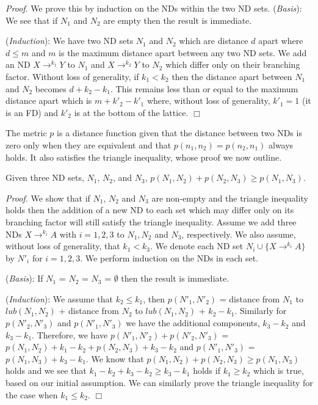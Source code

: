 {\em Proof}. We prove this by induction on the NDs within the two ND sets.\newline 
\smallskip
\indent ({\em Basis}): We see that if $N_1$ and $N_2$ are empty then the
result is immediate.

\smallskip

({\em Induction}): We have two ND sets $N_1$ and $N_2$ which are distance
$d$ apart where $d \le m$ and $m$ is the maximum distance apart between
any two ND sets. We add an ND $X \to^{k_1} Y$
to $N_1$ and $X \to^{k_2} Y$ to $N_2$ which differ only
on their branching factor. Without loss of generality, if $k_1 < k_2$ then the
distance apart between $N_1$ and $N_2$ becomes $d + k_2 - k_1$. This 
remains less than or equal to the maximum distance apart which is $m + k'_2 -
k'_1$ where, without loss of generality, $k'_1 = 1$ (it is an FD) and
$k'_2$ is at the bottom of the lattice. $\Box$

\smallskip

The metric $p$ is a distance function given that the distance
between two NDs is zero only when they are equivalent and that 
$p(n_1,n_2) = p(n_2,n_1)$ always holds. It also satisfies the 
triangle inequality, whose proof we now outline. 

\begin{theorem}
\begin{rm}
Given three ND sets, $N_1$, $N_2$, and $N_3$, $p(N_1,N_2) + p(N_2,N_3)
\ge p(N_1,N_3)$.
\end{rm}
\end{theorem}
\smallskip

{\em Proof.} We show that if $N_1$, $N_2$ and $N_3$ are non-empty and the 
triangle
inequality holds then the addition of a new ND to each set which may
differ only on its branching factor will still satisfy the triangle inequality.
Assume we add three NDs $X \to^{k_i} A$ with $i = 1,2,3$ to $N_1,N_2$ and
$N_3$, respectively. We also assume, without loss of generality, that 
$k_1 < k_3$. We denote each ND set $N_i \cup \{ X \to^{k_i} A \}$ by $N'_i$
for $i = 1,2,3$. We perform induction on the NDs in each set.

\smallskip
({\em Basis}): If $N_1$ = $N_2$ = $N_3$ = $\emptyset$ then the 
result is immediate.

\smallskip
({\em Induction}):
 We assume that $k_2 \le k_1$, then $p(N'_1,N'_2)$ =
distance from $N_1$ to $lub(N_1,N_2)$ + distance from $N_2$ to $lub(N_1,N_2)$ +
$k_2 - k_1$. Similarly for $p(N'_2,N'_3)$ and $p(N'_1,N'_3)$ we have the
additional components, $k_3 - k_2$ and $k_3 - k_1$. Therefore, we have
$p(N'_1,N'_2) + p(N'_2,N'_3)$ = $p(N_1,N_2) + k_1 - k_2 + p(N_2,N_3) +
k_3 - k_2$ and $p(N'_1,N'_3)$ = $p(N_1,N_3) + k_3 - k_1$. We know that  
$p(N_1,N_2) + p(N_2,N_3) \ge p(N_1,N_3)$ holds and we see
 that  $k_1 - k_2 + k_3 - k_2 \ge k_3 - k_1$ holds if $k_1 \ge k_2$ which
is true, based on our initial assumption. We can similarly prove the 
triangle inequality for the case when $k_1 \le k_2$. $\Box$


